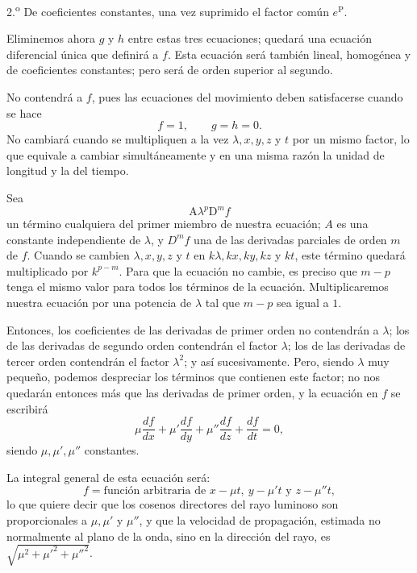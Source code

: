 2.\textsuperscript{o} De coeficientes constantes, una vez suprimido el
factor común $e^{\mathrm P}$.

Eliminemos ahora $g$ y $h$ entre estas tres ecuaciones; quedará una
ecuación diferencial única que definirá a $f$. Esta ecuación será también
lineal, homogénea y de coeficientes constantes; pero será de orden
superior al segundo.

No contendrá a $f$, pues las ecuaciones del movimiento deben satisfacerse
cuando se hace
\[
f=1,\qquad g=h=0.
\]
No cambiará cuando se multipliquen a la vez $\lambda,x,y,z$ y $t$ por un
mismo factor, lo que equivale a cambiar simultáneamente y en una misma
razón la unidad de longitud y la del tiempo.

Sea
\[
\mathrm A\lambda^p\mathrm D^mf
\]
un término cualquiera del primer miembro de nuestra ecuación; $A$ es una
constante independiente de $\lambda$, y $D^mf$ una de las derivadas
parciales de orden $m$ de $f$. Cuando se cambien $\lambda,x,y,z$ y $t$ en
$k\lambda,kx,ky,kz$ y $kt$, este término quedará multiplicado por
$k^{p-m}$. Para que la ecuación no cambie, es preciso que $m-p$ tenga el
mismo valor para todos los términos de la ecuación. Multiplicaremos
nuestra ecuación por una potencia de $\lambda$ tal que $m-p$ sea igual a
$1$.

Entonces, los coeficientes de las derivadas de primer orden no
contendrán a $\lambda$; los de las derivadas de segundo orden contendrán
el factor $\lambda$; los de las derivadas de tercer orden contendrán el
factor $\lambda^2$; y así sucesivamente. Pero, siendo $\lambda$ muy
pequeño, podemos despreciar los términos que contienen este factor; no
nos quedarán entonces más que las derivadas de primer orden, y la
ecuación en $f$ se escribirá
\[
\mu\frac{df}{dx}+\mu'\frac{df}{dy}+\mu''\frac{df}{dz}+\frac{df}{dt}=0,
\]
siendo $\mu,\mu',\mu''$ constantes.

La integral general de esta ecuación será:
\[
f=\text{función arbitraria de }x-\mu t,\ y-\mu't\text{ y }z-\mu''t,
\]
lo que quiere decir que los cosenos directores del rayo luminoso son
proporcionales a $\mu,\mu'$ y $\mu''$, y que la velocidad de propagación,
estimada no normalmente al plano de la onda, sino en la dirección del
rayo, es $\sqrt{\mu^2+\mu'^2+\mu''^2}$.

